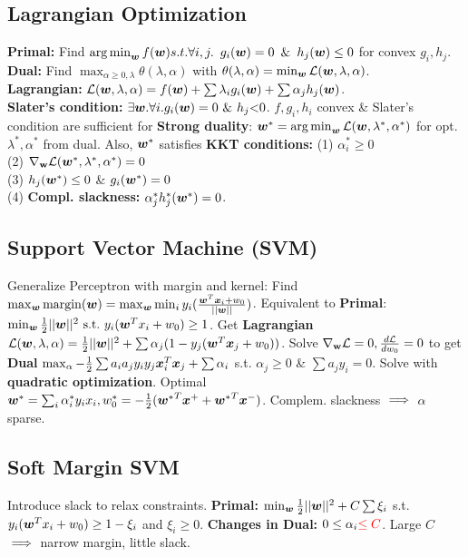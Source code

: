 \subsection*{Lagrangian Optimization}
\textbf{Primal:} Find $\operatorname*{arg\,min}_{\bm{w}} f({\bm{w}})\\s.t. \forall i,j.\,\,\,g_i({\bm{w}})=0\,\,\,\&\,\,\,h_j({\bm{w}}) \leq 0$ for convex $g_i, h_j$.\\
\textbf{Dual:} Find $\max_{\alpha\geq0,\lambda} {\theta(\lambda, \alpha)}$ with ${\theta(\lambda, \alpha)} = \min_{\bm{w}}\mathcal{L}({\bm{w}}, \lambda, \alpha)$.\\
\textbf{Lagrangian:} $\mathcal{L}({\bm{w}}, \mathbf{\lambda}, \mathbf{\alpha}) = f({\bm{w}}) + \sum\lambda_i g_i({\bm{w}}) + \sum\alpha_j h_j({\bm{w}})$.\\
\textbf{Slater's condition:} $\exists {\bm{w}}. \forall i. g_i({\bm{w}})=0\,\,\&\,\,h_j\mathbf{<}0$.
$f, g_i, h_i$ convex \& Slater's condition are sufficient for \textbf{Strong duality}: ${\bm{w}}^* = \operatorname*{arg\,min}_{\bm{w}} \mathcal{L}({\bm{w}}, \lambda^*, \alpha^*)$ for opt. $\lambda^*, \alpha^*$ from dual. Also, ${\bm{w}}^*$ satisfies \textbf{KKT conditions:} (1) $\alpha^*_i \geq 0$\\
(2) $\nabla_{\mathbf{w}}\mathcal{L}({\bm{w}}^*,\lambda^*,\alpha^*)=0$\\
(3) $h_j({\bm{w}}^*) \leq 0$ \& $g_i({\bm{w}}^*) = 0$\\
(4) \textbf{Compl. slackness:} $\alpha^*_jh^*_j({\bm{w}}^*) = 0$.

\subsection*{Support Vector Machine (SVM)}
Generalize Perceptron with margin and kernel:
Find $\max_{\bm{w}} \mathrm{margin}({\bm{w}}) = \max_{\bm{w}}\min_i y_i(\frac{{\bm{w}}^T{\bm{x}}_i + w_0}{||{\bm{w}}||})$. Equivalent to \textbf{Primal}: $\min_{\bm{w}} \frac{1}{2}||{\bm{w}}||^2\,\,\mathrm{s.t.}\,\, y_i({\bm{w}}^Tx_i+w_0) \geq 1$. Get \textbf{Lagrangian} $\mathcal{L}({\bm{w}}, \lambda, \alpha) = \frac{1}{2}||{\bm{w}}||^2 + \sum\alpha_j (1-y_j({\bm{w}}^T{\bm{x}}_j+w_0))$. Solve $\nabla_{\mathbf{w}}\mathcal{L}=0, \frac{d\mathcal{L}}{dw_0}=0$ to get \textbf{Dual} $\max_\alpha -\frac{1}{2}\sum a_ia_jy_iy_j{\bm{x}}^T_i{\bm{x}}_j + \sum\alpha_i$ s.t.
$\alpha_j\geq 0$ \& $\sum a_jy_i = 0$. Solve with \textbf{quadratic optimization}. Optimal ${\bm{w}}^* = \sum_i \alpha^*_i y_i x_i, w_0^* = -\frac{1}{2}({{\bm{w}}^*}^T{{\bm{x}}^+} + {{\bm{w}}^*}^T{{\bm{x}}^-})$. Complem. slackness $\color{black}\implies$ $\alpha$ sparse.
\subsection*{Soft Margin SVM}
Introduce slack to relax constraints.
\textbf{Primal:} $\min_{\bm{w}} \frac{1}{2}||{\bm{w}}||^2 + C\sum\xi_i$ s.t. $y_i({\bm{w}}^Tx_i+w_0) \geq 1-\xi_i$ and $\xi_i \geq 0$.
\textbf{Changes in Dual:} $0\leq\alpha_i{\color{red}\leq C}$.
Large $C$ $\color{black}\implies$ narrow margin, little slack. 

